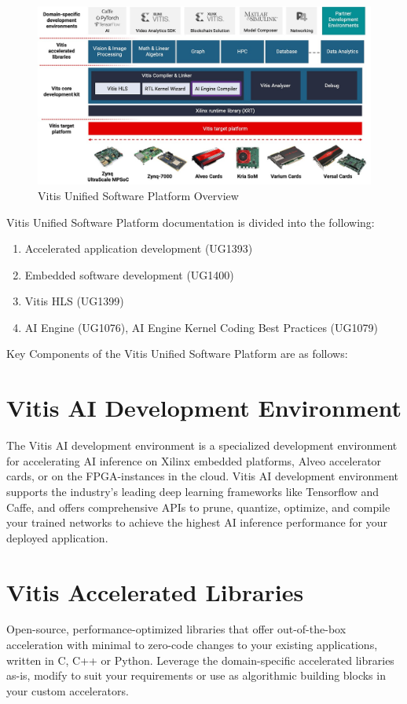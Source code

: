 \documentclass{report}
\begin{document}
	\begin{figure}[H]
		\begin{center}
			\includegraphics[width=\textwidth]{images/overview.jpg}
			\caption{Vitis Unified Software Platform Overview}
			\label{VitisOverview}
		\end{center}
	\end{figure}

	Vitis Unified Software Platform documentation is divided into the following:
	\begin{enumerate}
		\item Accelerated application development (UG1393)
		\item Embedded software development (UG1400)
		\item Vitis HLS (UG1399)
		\item AI Engine (UG1076), AI Engine Kernel Coding Best Practices (UG1079)
	\end{enumerate}
	
	Key Components of the Vitis Unified Software Platform are as follows:
	
	\section{Vitis AI Development Environment}
	The Vitis AI development environment is a specialized development environment for accelerating AI inference on Xilinx embedded platforms, Alveo accelerator cards, or on the FPGA-instances in the cloud. Vitis AI development environment supports the industry's leading deep learning frameworks like Tensorflow and Caffe, and offers comprehensive APIs to prune, quantize, optimize, and compile your trained networks to achieve the highest AI inference performance for your deployed application. 


	\section{Vitis Accelerated Libraries}
	Open-source, performance-optimized libraries that offer out-of-the-box acceleration with minimal to zero-code changes to your existing applications, written in C, C++ or Python. Leverage the domain-specific accelerated libraries as-is, modify to suit your requirements or use as algorithmic building blocks in your custom accelerators.
\end{document}
